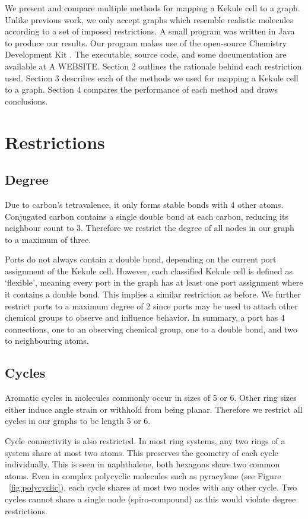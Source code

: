 \documentclass[12pt]{article}
\begin{document}
We present and compare multiple methods for mapping a Kekule cell to a graph. Unlike previous work, we only accept graphs which resemble realistic molecules according to a set of imposed restrictions. A small program was written in Java to produce our results. Our program makes use of the open-source Chemistry Development Kit \cite{CDK}. The executable, source code, and some documentation are available at A WEBSITE. Section 2 outlines the rationale behind each restriction used. Section 3 describes each of the methods we used for mapping a Kekule cell to a graph. Section 4 compares the performance of each method and draws conclusions. 

\section{Restrictions}

\subsection{Degree}

Due to carbon’s tetravalence, it only forms stable bonds with 4 other atoms. Conjugated carbon contains a single double bond at each carbon, reducing its neighbour count to 3. Therefore we restrict the degree of all nodes in our graph to a maximum of three. 

Ports do not always contain a double bond, depending on the current port assignment of the Kekule cell. However, each classified Kekule cell is defined as ‘flexible’, meaning every port in the graph has at least one port assignment where it contains a double bond. This implies a similar restriction as before. We further restrict ports to a maximum degree of 2 since ports may be used to attach other chemical groups to observe and influence behavior. In summary, a port has 4 connections, one to an observing chemical group, one to a double bond, and two to neighbouring atoms. 

\subsection{Cycles}
Aromatic cycles in molecules commonly occur in sizes of 5 or 6. Other ring sizes either induce angle strain or withhold from being planar. Therefore we restrict all cycles in our graphs to be length 5 or 6. 

Cycle connectivity is also restricted. In most ring systems, any two rings of a system share at most two atoms. This preserves the geometry of each cycle individually. This is seen in naphthalene, both hexagons share two common atoms. Even in complex polycyclic molecules such as pyracylene (see Figure ~\ref{fig:polycyclic}), each cycle shares at most two nodes with any other cycle. Two cycles cannot share a single node (spiro-compound) as this would violate degree restrictions.
\end{document}
